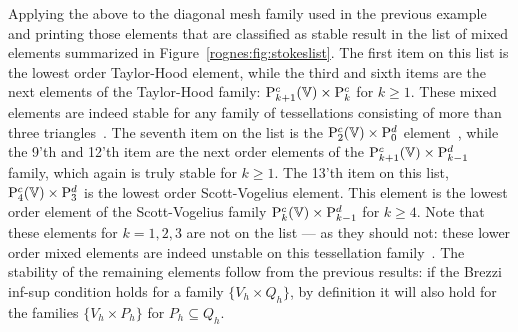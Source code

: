 Applying the above to the diagonal mesh family used in the previous
example and printing those elements that are classified as stable
result in the list of mixed elements summarized in
Figure~\ref{rognes:fig:stokeslist}. The first item on this list is the
lowest order Taylor-Hood element, while the third and sixth items are
the next elements of the Taylor-Hood family:
$\mathrm{P}^c_{k+1}(\mathbb{V}) \times \mathrm{P}^c_{k}$ for $k \geq
1$. These mixed elements are indeed stable for any family of
tessellations consisting of more than three
triangles~\cite{TaylorHood1973, BrezziFalk1991}. The seventh item on
the list is the $\mathrm{P}^c_2(\mathbb{V}) \times \mathrm{P}^d_0$
element~\cite{CrouzeixRaviart1973}, while the 9'th and 12'th item are
the next order elements of the $\mathrm{P}^c_{k+1}(\mathbb{V}) \times
\mathrm{P}^d_{k-1}$ family, which again is truly stable for $k \geq
1$. The 13'th item on this list, $\mathrm{P}^c_4(\mathbb{V}) \times
\mathrm{P}^d_3$ is the lowest order Scott-Vogelius element. This element
is the lowest order element of the Scott-Vogelius family
$\mathrm{P}^c_{k}(\mathbb{V}) \times \mathrm{P}^d_{k-1}$ for $k \geq
4$. Note that these elements for $k = 1, 2, 3$ are not on the list ---
as they should not: these lower order mixed elements are indeed
unstable on this tessellation family~\cite{Qin1994}. The stability of
the remaining elements follow from the previous results: if the Brezzi
inf-sup condition holds for a family $\{V_h \times Q_h\}$, by
definition it will also hold for the families $\{V_h \times P_h\}$ for
$P_h \subseteq Q_h$.
